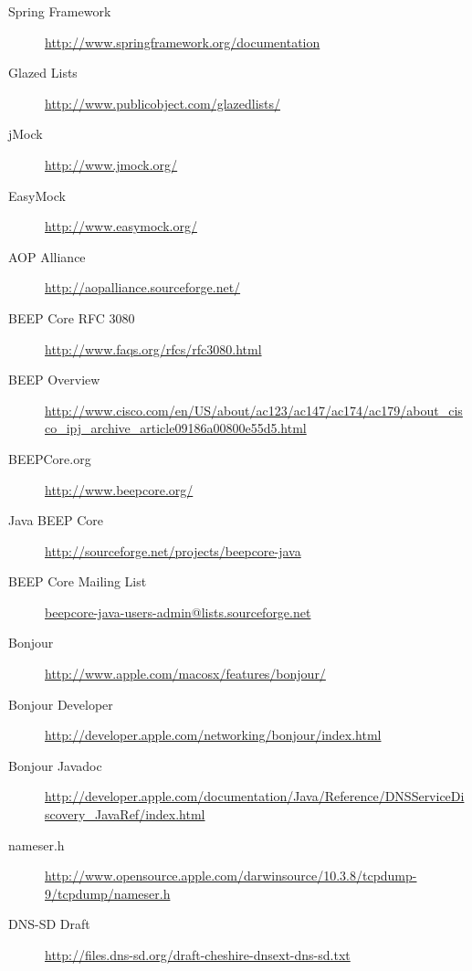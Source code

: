 \begin{description}
 \item[Spring Framework] \href{http://www.springframework.org/documentation}{http://www.springframework.org/documentation}
 \item[Glazed Lists] \href{http://www.publicobject.com/glazedlists/}{http://www.publicobject.com/glazedlists/}
 \item[jMock] \href{http://www.jmock.org/}{http://www.jmock.org/}
 \item[EasyMock] \href{http://www.easymock.org/}{http://www.easymock.org/}
 \item[AOP Alliance] \href{http://aopalliance.sourceforge.net/}{http://aopalliance.sourceforge.net/}
  \item[BEEP Core RFC 3080] \href{http://www.faqs.org/rfcs/rfc3080.html}{http://www.faqs.org/rfcs/rfc3080.html}
 \item[BEEP Overview] \href{http://www.cisco.com/en/US/about/ac123/ac147/ac174/ac179/about_cisco_ipj_archive_article09186a00800e55d5.html}{http://www.cisco.com/en/US/about/ac123/ac147/ac174/ac179/about_cisco_ipj_archive_article09186a00800e55d5.html}
 \item[BEEPCore.org] \href{http://www.beepcore.org/}{http://www.beepcore.org/}
 \item[Java BEEP Core] \href{http://sourceforge.net/projects/beepcore-java}{http://sourceforge.net/projects/beepcore-java}
 \item[BEEP Core Mailing List] \href{beepcore-java-users-admin@lists.sourceforge.net}{beepcore-java-users-admin@lists.sourceforge.net}
 \item[Bonjour] \href{http://www.apple.com/macosx/features/bonjour/}{http://www.apple.com/macosx/features/bonjour/}
 \item[Bonjour Developer] \href{http://developer.apple.com/networking/bonjour/index.html}{http://developer.apple.com/networking/bonjour/index.html}
 \item[Bonjour Javadoc] \href{http://developer.apple.com/documentation/Java/Reference/DNSServiceDiscovery_JavaRef/index.html}{http://developer.apple.com/documentation/Java/Reference/DNSServiceDiscovery_JavaRef/index.html}
 \item[nameser.h] \href{http://www.opensource.apple.com/darwinsource/10.3.8/tcpdump-9/tcpdump/nameser.h}{http://www.opensource.apple.com/darwinsource/10.3.8/tcpdump-9/tcpdump/nameser.h} 
 \item[DNS-SD Draft] \href{http://files.dns-sd.org/draft-cheshire-dnsext-dns-sd.txt}{http://files.dns-sd.org/draft-cheshire-dnsext-dns-sd.txt}

\end{description}
